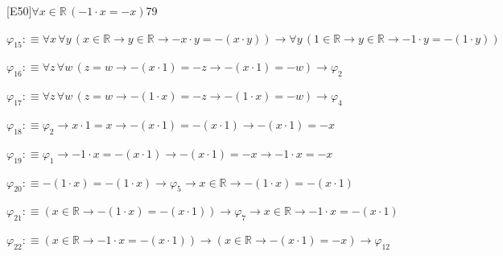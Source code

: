 \begin{fullproof}{[E50]}{$\forall x \in \mathbb{R}\,(-1 \cdot x = -x)$}{79}
\begin{abbrevlist}
\item $\varphi_{15} :\equiv \forall x\,\forall y\,(x \in \mathbb{R} \to y \in \mathbb{R} \to -x \cdot y = -(x \cdot y)) \to \forall y\,(1 \in \mathbb{R} \to y \in \mathbb{R} \to -1 \cdot y = -(1 \cdot y))$
\item $\varphi_{16} :\equiv \forall z\,\forall w\,(z = w \to -(x \cdot 1) = -z \to -(x \cdot 1) = -w) \to \varphi_{2}$
\item $\varphi_{17} :\equiv \forall z\,\forall w\,(z = w \to -(1 \cdot x) = -z \to -(1 \cdot x) = -w) \to \varphi_{4}$
\item $\varphi_{18} :\equiv \varphi_{2} \to x \cdot 1 = x \to -(x \cdot 1) = -(x \cdot 1) \to -(x \cdot 1) = -x$
\item $\varphi_{19} :\equiv \varphi_{1} \to -1 \cdot x = -(x \cdot 1) \to -(x \cdot 1) = -x \to -1 \cdot x = -x$
\item $\varphi_{20} :\equiv -(1 \cdot x) = -(1 \cdot x) \to \varphi_{5} \to x \in \mathbb{R} \to -(1 \cdot x) = -(x \cdot 1)$
\item $\varphi_{21} :\equiv (x \in \mathbb{R} \to -(1 \cdot x) = -(x \cdot 1)) \to \varphi_{7} \to x \in \mathbb{R} \to -1 \cdot x = -(x \cdot 1)$
\item $\varphi_{22} :\equiv (x \in \mathbb{R} \to -1 \cdot x = -(x \cdot 1)) \to (x \in \mathbb{R} \to -(x \cdot 1) = -x) \to \varphi_{12}$
\end{abbrevlist}
\end{fullproof}
